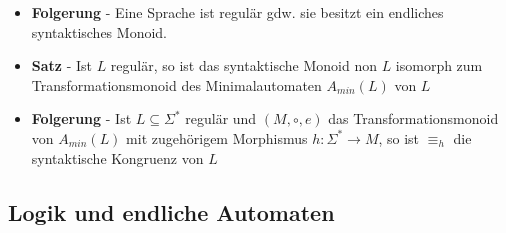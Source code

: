\documentclass[12pt, a4paper]{article}
\begin{document}
\begin{itemize}
		\item \textbf{Folgerung} - Eine Sprache ist regulär gdw. sie besitzt ein endliches syntaktisches Monoid.
		
		\item \textbf{Satz} - Ist $L$ regulär, so ist das syntaktische Monoid non $L$ isomorph zum Transformationsmonoid des Minimalautomaten $A_{min}(L)$ von $L$
		
		\item \textbf{Folgerung} - Ist $L\subseteq\Sigma^{*}$ regulär und $(M,\circ,e)$ das Transformationsmonoid von $A_{min}(L)$ mit zugehörigem Morphismus $h:\Sigma^{*}\rightarrow M$, so ist $\equiv_{h}$ die syntaktische Kongruenz von $L$
		
	\end{itemize}
	\subsection{Logik und endliche Automaten}
\end{document}

